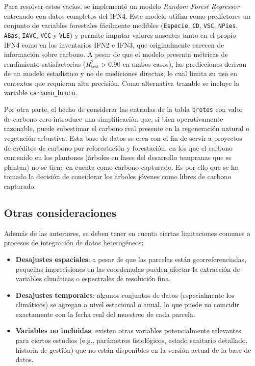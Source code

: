 Para resolver estos vacíos, se implementó un modelo \textit{Random Forest Regressor} entrenado con datos completos del IFN4. Este modelo utiliza como predictores un conjunto de variables forestales fácilmente medibles (\texttt{Especie}, \texttt{CD}, \texttt{VSC}, \texttt{NPies}, \texttt{ABas}, \texttt{IAVC}, \texttt{VCC} y \texttt{VLE}) y permite imputar valores ausentes tanto en el propio IFN4 como en los inventarios IFN2 e IFN3, que originalmente carecen de información sobre carbono. A pesar de que el modelo presenta métricas de rendimiento satisfactorias ($R^2_{\text{test}} > 0.90$ en ambos casos), las predicciones derivan de un modelo estadístico y no de mediciones directas, lo cual limita su uso en contextos que requieran alta precisión. Como alternativa trazable se incluye la variable \texttt{carbono\_bruto}.

\medskip

Por otra parte, el hecho de considerar las entradas de la tabla \texttt{brotes} con valor de carbono cero introduce una simplificación que, si bien operativamente razonable, puede subestimar el carbono real presente en la regeneración natural o vegetación arbustiva. Esta base de datos se crea con el fin de servir a proyectos de créditos de carbono por reforestación y forestación, en los que el carbono contenido en los plantones (árboles en fases del desarrollo tempranas que se plantan) no se tiene en cuenta como carbono capturado. Es por ello que se ha tomado la decisión de considerar los árboles jóvenes como libres de carbono capturado. 


\subsection*{Otras consideraciones}

Además de las anteriores, se deben tener en cuenta ciertas limitaciones comunes a procesos de integración de datos heterogéneos:

\begin{itemize}
    \item \textbf{Desajustes espaciales}: a pesar de que las parcelas están georreferenciadas, pequeñas imprecisiones en las coordenadas pueden afectar la extracción de variables climáticas o espectrales de resolución fina.
    
    \item \textbf{Desajustes temporales}: algunos conjuntos de datos (especialmente los climáticos) se agregan a nivel estacional o anual, lo que puede no coincidir exactamente con la fecha real del muestreo de cada parcela.
    
    \item \textbf{Variables no incluidas}: existen otras variables potencialmente relevantes para ciertos estudios (e.g., parámetros fisiológicos, estado sanitario detallado, historia de gestión) que no están disponibles en la versión actual de la base de datos.
\end{itemize}

